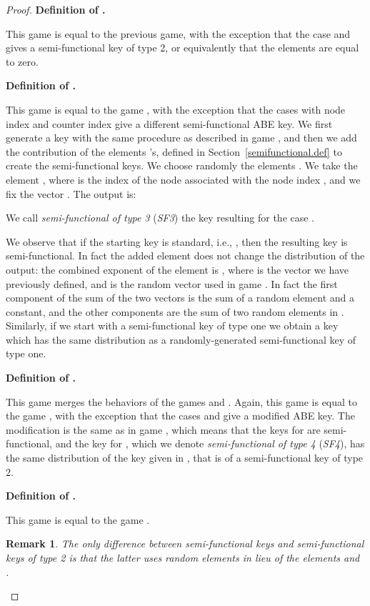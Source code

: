 \documentclass[a4paper,10pt]{article}
\newtheorem{remark}{Remark}
\newcommand{\randomchoose}[1]{We choose randomly the element\ifstrequal{#1}{s}{}{s} }
\newcommand{\game}[2]{}
\newcommand{\gamedef}[3]{
\textbf{Definition of \game{#1}{#2}.}
#3}
\newcommand{\sfthree}{SF3}
\newcommand{\sffour}{SF4}
\begin{document}
\begin{proof}
		\gamedef{H}{k,2}{
		This game is equal to the previous game, with the exception that the case  and  gives a semi-functional key of type 2, or equivalently that the elements  are equal to zero.
		}
		
		\gamedef{H^\prime}{k,1}{
		This game is equal to the game \game{H}{k,1}, with the exception that the cases with node index  and counter index  give a different semi-functional ABE key. We first generate a key  with the same procedure as described in game \game{H}{k,1}, and then we add the contribution of the elements 's, defined in Section~\ref{semifunctional.def} to create the semi-functional keys.
		\randomchoose{p}{.
		}
		We take the element , where  is the index of the node  associated with the node index , and we fix the vector . The output is:
		
		We call \emph{semi-functional of type 3} (\emph{\sfthree}) the key resulting for the case .
		
		We observe that if the starting key is standard, i.e., , then the resulting key is semi-functional. In fact the added element does not change the distribution of the output: the combined exponent of the element  is , where  is the vector we have previously defined, and  is the random vector used in game \game{H}{k,1}. In fact the first component of the sum of the two vectors is the sum of a random element and a constant, and the other components are the sum of two random elements in .
		Similarly, if we start with a semi-functional key of type one we obtain a key which has the same distribution as a randomly-generated semi-functional key of type one.
		}
		
		\gamedef{H^\prime}{k,2}{
		This game merges the behaviors of the games \game{H}{k,2} and \game{H^\prime}{k,1}. Again, this game is equal to the game \game{H}{k,2}, with the exception that the cases  and  give a modified ABE key. The modification is the same as in game \game{H^\prime}{k,1}, which means that the keys for  are semi-functional, and the key for , which we denote \emph{semi-functional of type 4} (\emph{\sffour}), has the same distribution of the key given in \game{H}{k,2}, that is of a semi-functional key of type 2.
		}
		
		\gamedef{H^{\prime\prime}}{}{
		This game is equal to the game \game{G}{1,h}.
		}
		
		\begin{remark}The only difference between semi-functional keys and semi-functional keys of type 2 is that the latter uses random elements in lieu of the elements  and .
		\end{remark}
		

\end{proof}
\end{document}
